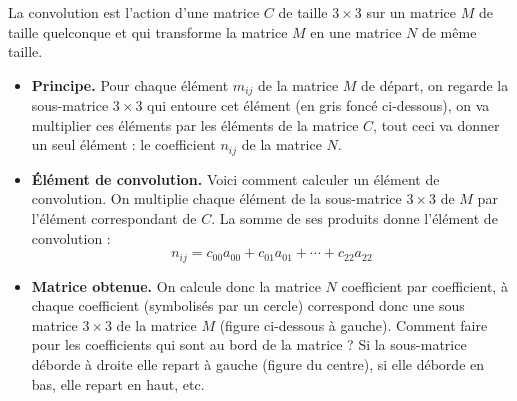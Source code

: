 \documentclass[11pt,class=report,crop=false]{standalone}
\begin{document}




\bigskip


\begin{cours}


La convolution est l'action d'une matrice $C$ de taille $3\times 3$ sur un matrice $M$ de taille quelconque et qui transforme la matrice $M$ en une matrice $N$ de même taille. 

\begin{itemize}
\item \textbf{Principe.}
Pour chaque élément $m_{ij}$ de la matrice $M$ de départ, on regarde la sous-matrice $3\times3$ qui entoure cet élément (en gris foncé ci-dessous), on va multiplier ces éléments par les éléments de la matrice $C$, tout ceci va donner un seul élément : le coefficient $n_{ij}$ de la matrice $N$. 

\medskip



\item \textbf{\'Elément de convolution.}
Voici comment calculer un élément de convolution. 
On multiplie chaque élément de la sous-matrice $3\times 3$ de $M$ par l'élément correspondant de $C$. La somme de ses produits donne l'élément de convolution :
$$n_{ij} = c_{00}a_{00} + c_{01}a_{01} + \cdots + c_{22}a_{22}$$

\medskip


\item \textbf{Matrice obtenue.}
On calcule donc la matrice $N$ coefficient par coefficient, à chaque coefficient (symbolisés par un cercle) correspond donc une sous matrice $3\times 3$ de la matrice  $M$ (figure ci-dessous à gauche). Comment faire pour les coefficients qui sont au bord de la matrice ?
Si la sous-matrice déborde à droite elle repart à gauche (figure du centre), si elle 
déborde en bas, elle repart en haut, etc.


\end{itemize}
\end{cours}
\end{document}
